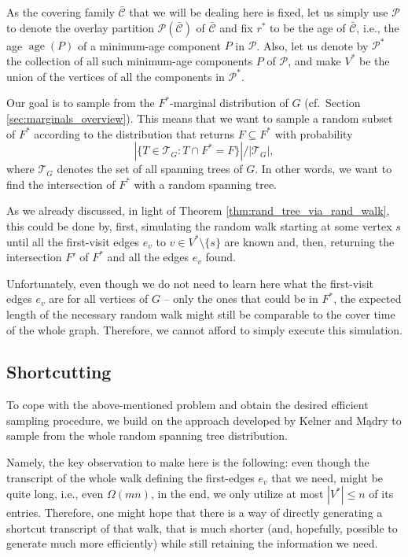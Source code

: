 \documentclass[11pt, letterpaper]{article}
\DeclareMathOperator{\age}{age}
\newcommand{\ocC}{\bar{\mathcal{C}}}
\newcommand{\cP}{\mathcal{P}}
\newcommand{\cT}{\mathcal{T}}
\begin{document}
As the covering family $\ocC$ that we will be dealing here is fixed, let us simply use $\cP$ to denote the overlay partition $\cP(\ocC)$ of $\ocC$ and fix $r^*$ to be the age of $\ocC$, i.e., the age $\age(P)$ of a minimum-age component $P$ in $\cP$. Also, let us denote by $\cP^*$ the collection of all such minimum-age components $P$ of $\cP$, and make $V^*$ be the union of the vertices of all the components in $\cP^*$. 

Our goal is to sample from the $F^*$-marginal distribution of $G$ (cf.~Section \ref{sec:marginals_overview}). This means that we want to sample a random subset of $F^*$ according to the distribution that returns $F\subseteq F^*$ with probability 
\[
|\{T\in \cT_G: T\cap F^*=F\}|/|\cT_G|,
\]
where $\cT_G$ denotes the set of all spanning trees of $G$. In other words, we want to find the intersection of $F^*$ with a random spanning tree.

As we already discussed, in light of Theorem \ref{thm:rand_tree_via_rand_walk}, this could be done by, first, simulating the random walk starting at some vertex $s$ until all the first-visit edges $e_v$ to $v\in V^*\setminus \{s\}$ are known and, then, returning the intersection $F'$ of $F^*$ and all the edges $e_v$ found. 

Unfortunately, even though we do not need to learn here what the first-visit edges $e_v$ are for all vertices of $G$ -- only the ones that could be in $F^*$, the expected length of the necessary random walk might still be comparable to the cover time of the whole graph. Therefore, we cannot afford to simply execute this simulation. 


\subsection{Shortcutting}\label{sec:shortcutting}
To cope with the above-mentioned problem and obtain the desired efficient sampling procedure, we build on the approach developed by Kelner and Mądry \cite{KelnerM09} to sample from the whole random spanning tree distribution. 

Namely, the key observation to make here is the following: even though the transcript of the whole walk defining the first-edges $e_v$ that we need, might be quite long, i.e., even $\Omega(mn)$, in the end, we only utilize at most $|V^*|\leq n$ of its entries. Therefore, one might hope that there is a way of directly generating a  shortcut transcript of that walk, that is much shorter (and, hopefully, possible to generate much more efficiently) while still retaining the information we need.
\end{document}
